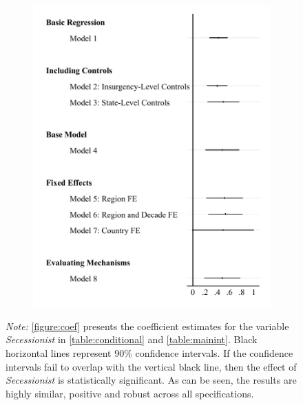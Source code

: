 \documentclass[12pt, letterpaper]{article}
\begin{document}
\begin{figure}[h]
\begin{subfigure}{0.45\textwidth}
    \includegraphics[width=\textwidth]{coefmainint.pdf}
    \end{subfigure}
  \begin{tablenotes}
\raggedright \footnotesize{\textit{Note:} \autoref{figure:coef} presents the coefficient estimates for the variable \textit{Secessionist} in \autoref{table:conditional} and \autoref{table:mainint}. Black horizontal lines represent 90\% confidence intervals. If the confidence intervals fail to overlap with the vertical black line, then the effect of \textit{Secessionist} is statistically significant. As can be seen, the results are highly similar, positive and robust across all specifications.}
\end{tablenotes}
\end{figure}
\end{document}
